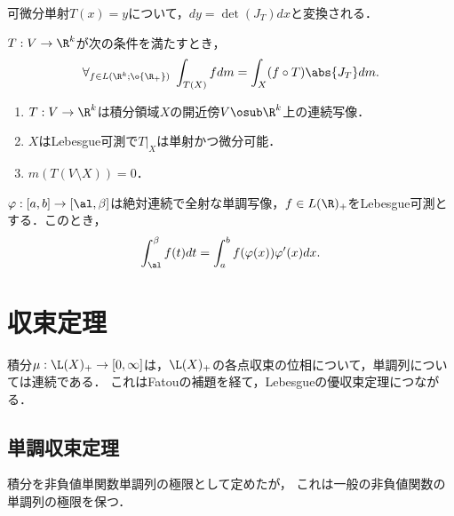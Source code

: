\documentclass[uplatex, dvipdfmx]{jsreport}
\begin{document}
\begin{tcolorbox}[colframe=ForestGreen, colback=ForestGreen!10!white,breakable,colbacktitle=ForestGreen!40!white,coltitle=black,fonttitle=\bfseries\sffamily,
title=]
    可微分単射$T(x)=y$について，$dy=\det(J_T)dx$と変換される．
\end{tcolorbox}

\begin{theorem}
    $T:V\to\R^k$が次の条件を満たすとき，
    \[\forall_{f\in L(\R^k;\o{\R_+})}\;\int_{T(X)}fdm=\int_X(f\circ T)\abs{J_T}dm.\]
    \begin{enumerate}
        \item $T:V\to\R^k$は積分領域$X$の開近傍$V\osub\R^k$上の連続写像．
        \item $X$はLebesgue可測で$T|_X$は単射かつ微分可能．
        \item $m(T(V\setminus X))=0$．
    \end{enumerate}
\end{theorem}

\begin{corollary}
    $\varphi:[a,b]\to[\al,\beta]$は絶対連続で全射な単調写像，$f\in L(\R)_+$をLebesgue可測とする．このとき，
    \[\int^\beta_\al f(t)dt=\int^b_af(\varphi(x))\varphi'(x)dx.\]
\end{corollary}

\section{収束定理}

\begin{tcolorbox}[colframe=ForestGreen, colback=ForestGreen!10!white,breakable,colbacktitle=ForestGreen!40!white,coltitle=black,fonttitle=\bfseries\sffamily,
title=]
    積分$\mu:\L(X)_+\to[0,\infty]$は，$\L(X)_+$の各点収束の位相について，単調列については連続である．
    これはFatouの補題を経て，Lebesgueの優収束定理につながる．
\end{tcolorbox}

\subsection{単調収束定理}

\begin{tcolorbox}[colframe=ForestGreen, colback=ForestGreen!10!white,breakable,colbacktitle=ForestGreen!40!white,coltitle=black,fonttitle=\bfseries\sffamily,
title=]
    積分を非負値単関数単調列の極限として定めたが，
    これは一般の非負値関数の単調列の極限を保つ．
\end{tcolorbox}
\end{document}
